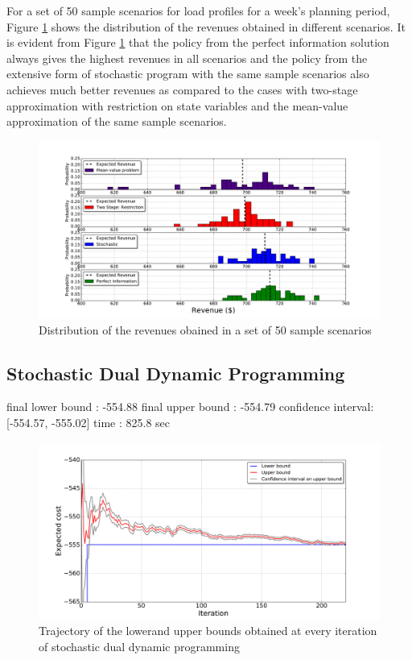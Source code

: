 \documentclass[11pt,twoside]{article}
\begin{document}
For a set of 50 sample scenarios for load profiles for a week's planning period, Figure \ref{fig:histogram} shows the distribution of the revenues obtained in different scenarios. It is evident from Figure \ref{fig:histogram} that the policy from the perfect information solution always gives the highest revenues in all scenarios and the policy from the extensive form of stochastic program with the same sample scenarios also achieves much better revenues as compared to the cases with two-stage approximation with restriction on state variables and the mean-value approximation of the same sample scenarios.
\begin{figure}[h!]
\begin{center}
\includegraphics[scale=0.4]
{Figures/Plots/fullproblem_stoch/histogram_costs.pdf} \caption{Distribution of the revenues obained in a set of 50 sample scenarios}\label{fig:histogram}\end{center}
\end{figure}
\FloatBarrier

\subsection{Stochastic Dual Dynamic Programming}
final lower bound : -554.88
final upper bound : -554.79 confidence interval: [-554.57, -555.02]
time : 825.8 sec
\begin{figure}[h!]
\begin{center}
\includegraphics[scale=0.4]
{Figures/Plots/dualdynamic/bounds.pdf} \caption{Trajectory of the lowerand upper bounds obtained at every iteration of stochastic dual dynamic programming}\label{fig:bounds}\end{center}
\end{figure}
\end{document}
